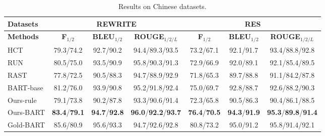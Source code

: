 \begin{table}[ht!]
\centering
\scriptsize
\begin{tabular}{l|ccc|ccc}
\toprule
\textbf{Datasets} & \multicolumn{3}{c|}{REWRITE} &\multicolumn{3}{c}{RES} \\ \midrule
\textbf{Methods}&    \textbf{F}$_{1/2}$ & \textbf{BLEU}$_{1/2}$ & \textbf{ROUGE}$_{1/2/L}$&    \textbf{F}$_{1/2}$ & \textbf{BLEU}$_{1/2}$ & \textbf{ROUGE}$_{1/2/L}$ \\ \midrule
HCT  & 79.3/74.2 & 92.7/90.2  & 94.4/89.3/93.5 & 73.2/67.1 & 92.1/91.7  & 93.4/88.8/92.8\\
RUN  & 80.5/75.0 & 93.5/90.9  & 95.8/90.3/91.3 & 72.9/66.9  & 92.0/89.1  & 92.1/85.4/89.5\\
RAST  & 77.8/72.5 & 90.5/88.3 & 94.7/88.9/92.9 & 71.8/65.3 & 89.7/88.8 & 91.1/84.2/87.8\\
BART-base &81.2/76.0 & 93.9/90.8  & 95.2/91.8/92.4 & 75.0/69.7 & 92.8/88.7  & 92.6/88.2/90.3\\
Ours-rule &79.1/73.8 & 90.2/87.8 &  93.3/90.6/91.4 & 72.3/65.8 & 90.5/86.3 & 90.4/86.1/88.5\\
Ours-BART & \textbf{83.4}/\textbf{79.1} & \textbf{94.7}/\textbf{92.8}  & \textbf{96.0}/\textbf{92.2}/\textbf{93.7} & \textbf{76.4}/\textbf{70.5} & \textbf{94.3}/\textbf{91.9}  & \textbf{95.3}/\textbf{89.8}/\textbf{91.4} \\ \midrule
Gold-BART &85.6/80.9  & 95.6/93.3 & 94.7/92.6/92.8 & 80.8/73.2 & 95.0/91.2 & 95.8/91.4/92.1 \\
\bottomrule
\end{tabular}
\caption{Results on Chinese datasets.}
\label{tab:chinese-result}
\end{table}





